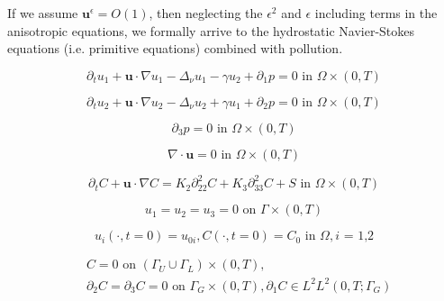 \documentclass[11pt]{article}
\begin{document}
If we assume $\mathbf{u}^\epsilon = O(1)$, then neglecting the $\epsilon^2$ and $\epsilon$ including terms in the anisotropic equations, we formally arrive to the hydrostatic Navier-Stokes equations (i.e. primitive equations) combined with pollution.

    \begin{equation} \label{HNSC1}    
    \partial_t u_1 + \mathbf{u} \cdot \nabla u_1 - \Delta_\nu u_1 -\gamma u_2 + \partial_1 p = 0 \text{ in } \Omega \times (0,T)
    \end{equation}
    
    \begin{equation} \label{HNSC2}   
    \partial_t u_2 + \mathbf{u} \cdot \nabla u_2 - \Delta_\nu u_2 + \gamma u_1 + \partial_2 p = 0 \text{ in } \Omega \times (0,T)
    \end{equation}
    
    \begin{equation} \label{HNSC3}   
    \partial_3 p = 0 \text{ in } \Omega \times (0,T)
    \end{equation}
    
    \begin{equation} \label{HNSC4}   
    \nabla \cdot \mathbf{u} = 0 \text{ in } \Omega \times (0,T)
    \end{equation}
    
    \begin{equation} \label{HNSC5}   
    \partial_t C + \mathbf{u} \cdot \nabla C = K_2 \partial_{22} ^ 2 C + K_3 \partial_{33} ^2 C + S \text{ in } \Omega \times (0,T)
    \end{equation}
    
    \begin{equation} \label{HNSC6}   
    u_1 = u_2 = u_3 = 0 \text{ on } \Gamma \times (0,T)
    \end{equation}
    
    \begin{equation} \label{HNSC7}   
    u_i (\cdot, t=0) = u_{0 i}, C (\cdot, t=0) = C_0 \text{ in } \Omega, \text{$i$ = 1,2}
    \end{equation}
    
    \begin{equation} \label{HNSC8}
      \begin{split}
        & C = 0 \text{ on } ( \Gamma_U \cup \Gamma_L) \times (0,T), \\
        & \partial_2 C = \partial_3 C = 0 \text{ on } \Gamma_G \times (0,T), \partial_1 C \in L^2 L^2 (0,T; \Gamma_G) \\
      \end{split}
    \end{equation}
    
\end{document}
